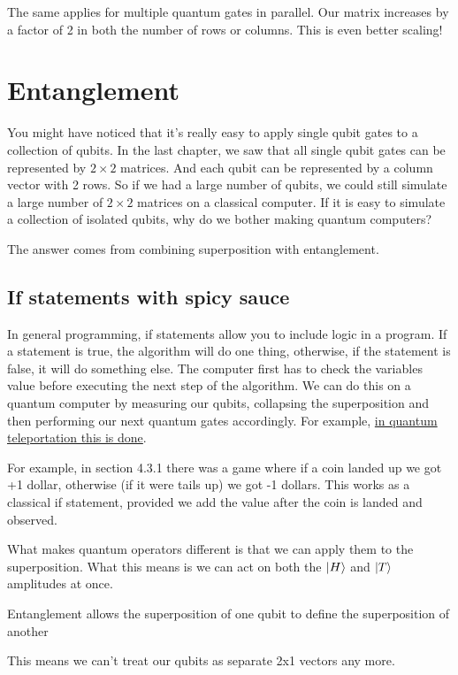 \documentclass{book}
\begin{document}
The same applies for multiple quantum gates in parallel. Our matrix increases by a factor of 2 in both the number of rows or columns. This is even better scaling!

\section{ Entanglement } 

You might have noticed that it's really easy to apply single qubit gates to a collection of qubits. In the last chapter, we saw that all single qubit gates can be represented by $ 2 \times 2$ matrices. And each qubit can be represented by a column vector with 2 rows. So if we had a large number of qubits, we could still simulate a large number of $2 \times 2$ matrices on a classical computer. If it is easy to simulate a collection of isolated qubits, why do we bother making quantum computers? 

The answer comes from combining superposition with entanglement. 

\subsection{ If statements with spicy sauce }

In general programming, if statements allow you to include logic in a program. If a statement is true, the algorithm will do one thing, otherwise, if the statement is false, it will do something else. The computer first has to check the variables value before executing the next step of the algorithm. We can do this on a quantum computer by measuring our qubits, collapsing the superposition and then performing our next quantum gates accordingly. For example, \href{https://qiskit.org/textbook/ch-algorithms/teleportation.html}{in quantum teleportation this is done}. 

 For example, in section 4.3.1 there was a game where if a coin landed up we got +1 dollar, otherwise (if it were tails up) we got -1 dollars. This works as a classical if statement, provided we add the value after the coin is landed and observed. 

What makes quantum operators different is that we can apply them to the superposition. What this means is we can act on both the $\ket{H}$ and $\ket{T}$ amplitudes at once. 


Entanglement allows the superposition of one qubit to define the superposition of another

This means we can't treat our qubits as separate 2x1 vectors any more. 
\end{document}
